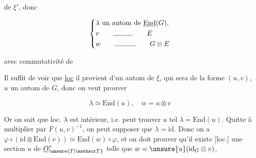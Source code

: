 
de $\xi'$, donc

\[
\left\{\begin{aligned}
&\lambda\ \text{un autom de }\underline{\mathrm{End}}(G),\\
&v\qquad\rule{2.8em}{.35pt}\qquad E\\
&w\qquad\rule{3em}{.35pt}\qquad G\otimes E
\end{aligned}\right.
\]

avec commutativité de


 Il suffit de voir que \uline{loc} il provient d'un 
autom de $\xi$, qui sera de la forme $(u,v)$, $u$ un autom
de $G$, donc on veut prouver

\[
\lambda\simeq\mathrm{End}(u),\quad w=u\otimes v
\]

Or on sait que loc. $\lambda$ est  intérieur, i.e.  
 peut trouver $u$ tel $\lambda=\mathrm{End}(u)$. Quitte à multiplier \inserted{$\sigma$} par
$F(u,v)^{-1}$, on peut supposer que $\lambda=\mathrm{id}$. Donc on  a
$\varphi\circ(\mathrm{id}\otimes\mathrm{End}(v))\simeq\mathrm{End}(w)\circ\varphi$, et on doit prouver qu'il existe [loc.]
une section $u$ de $\underline O_{\unsure{T|\mathscr T}}^{*}$ telle que $w=\unsure{u}( \mathrm{id}_{G}\otimes v)$,  



